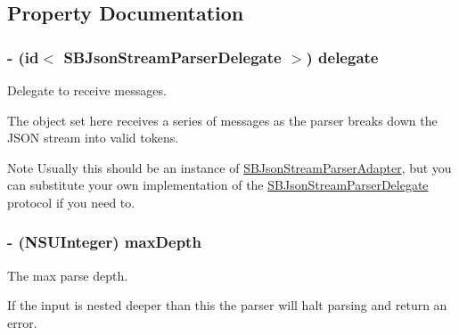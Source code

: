 \subsection{\-Property \-Documentation}
\hypertarget{interface_s_b_json_stream_parser_ae07425e91e0329ab3a1adeacf3122051}{
\subsubsection[{delegate}]{\setlength{\rightskip}{0pt plus 5cm}-\/ (id$<$ {\bf \-S\-B\-Json\-Stream\-Parser\-Delegate} $>$) delegate}}
\label{interface_s_b_json_stream_parser_ae07425e91e0329ab3a1adeacf3122051}


\-Delegate to receive messages. 

\-The object set here receives a series of messages as the parser breaks down the \-J\-S\-O\-N stream into valid tokens.

\begin{DoxyNote}{\-Note}
\-Usually this should be an instance of \hyperlink{interface_s_b_json_stream_parser_adapter}{\-S\-B\-Json\-Stream\-Parser\-Adapter}, but you can substitute your own implementation of the \hyperlink{protocol_s_b_json_stream_parser_delegate-p}{\-S\-B\-Json\-Stream\-Parser\-Delegate} protocol if you need to. 
\end{DoxyNote}
\hypertarget{interface_s_b_json_stream_parser_a1c6f49cb5dd676452994d96498bb5a3f}{
\subsubsection[{max\-Depth}]{\setlength{\rightskip}{0pt plus 5cm}-\/ (\-N\-S\-U\-Integer) max\-Depth}}
\label{interface_s_b_json_stream_parser_a1c6f49cb5dd676452994d96498bb5a3f}


\-The max parse depth. 

\-If the input is nested deeper than this the parser will halt parsing and return an error.

